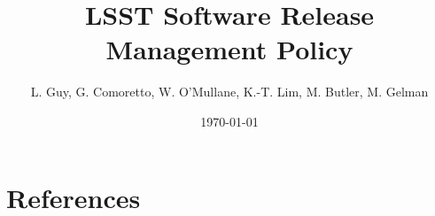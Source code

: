\documentclass[DM,lsstdraft,toc]{lsstdoc}
\title{LSST Software Release Management Policy}
\author{%
L. Guy, G. Comoretto, W. O'Mullane, K.-T. Lim, M. Butler, M. Gelman
}
\date{\today}
\begin{document}
\maketitle



\newpage


\newpage


\appendix




\section{References} \label{sec:bib}


\printglossaries
\end{document}
